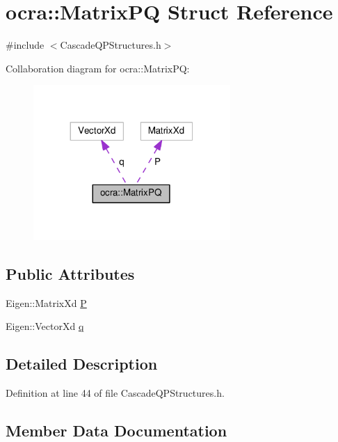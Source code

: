 \hypertarget{structocra_1_1MatrixPQ}{}\section{ocra\+:\+:Matrix\+PQ Struct Reference}
\label{structocra_1_1MatrixPQ}


{\ttfamily \#include $<$Cascade\+Q\+P\+Structures.\+h$>$}



Collaboration diagram for ocra\+:\+:Matrix\+PQ\+:
\nopagebreak
\begin{figure}[H]
\begin{center}
\leavevmode
\includegraphics[width=212pt]{d2/d68/structocra_1_1MatrixPQ__coll__graph}
\end{center}
\end{figure}
\subsection*{Public Attributes}
\begin{DoxyCompactItemize}
\item 
Eigen\+::\+Matrix\+Xd \hyperlink{structocra_1_1MatrixPQ_ae37e780774f14b1097de106d1480cee4}{P}
\item 
Eigen\+::\+Vector\+Xd \hyperlink{structocra_1_1MatrixPQ_a5b735797657100582565c6337fb090e1}{q}
\end{DoxyCompactItemize}


\subsection{Detailed Description}


Definition at line 44 of file Cascade\+Q\+P\+Structures.\+h.



\subsection{Member Data Documentation}
